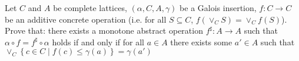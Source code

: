 \begin{exercise}{
    Let $C$ and $A$ be complete lattices, $(\alpha, C, A, \gamma)$ be a Galois insertion, $f: C \to C$ be an additive concrete operation (i.e. for all $S \subseteq C$, $f(\vee_C S) = \vee_C f(S)$). Prove that: there exists a monotone abstract operation $f^\sharp: A \to A$ such that $\alpha \circ f = f^\sharp \circ \alpha$ holds if and only if for all $a \in A$ there exists some $a' \in A$ such that $\vee_C \left\{ c \in C \mid f(c) \leq \gamma(a) \right\} = \gamma(a')$
}
    
\end{exercise}